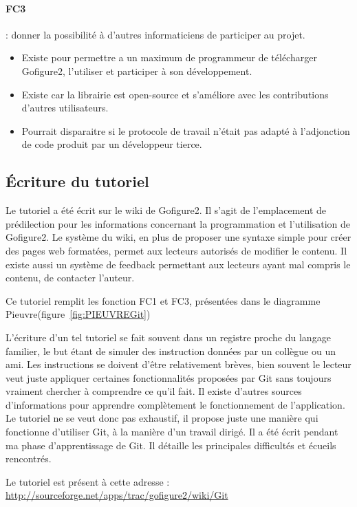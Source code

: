 \paragraph*{FC3} : donner la possibilité à d'autres informaticiens de participer au projet.
\begin{itemize}
  \item Existe pour permettre a un maximum de programmeur de télécharger Gofigure2, l'utiliser et participer à son développement.
  \item Existe car la librairie est open-source et s'améliore avec les contributions d'autres utilisateurs.
  \item Pourrait disparaitre si le protocole de travail n'était pas adapté à l'adjonction de code produit par un développeur tierce.
\end{itemize}


\subsection{Écriture du tutoriel}

Le tutoriel a été écrit sur le wiki de Gofigure2. Il s'agit de l'emplacement de prédilection pour les informations 
concernant la programmation et l'utilisation de Gofigure2. Le système du wiki, en plus de proposer une syntaxe simple 
pour créer des pages web formatées, permet aux lecteurs autorisés de modifier le contenu. 
Il existe aussi un système de feedback permettant aux lecteurs ayant mal compris le contenu, de contacter l'auteur.

Ce tutoriel remplit les fonction FC1 et FC3, présentées dans le diagramme Pieuvre(figure~\ref{fig:PIEUVREGit})

L'écriture d'un tel tutoriel se fait souvent dans un registre proche du langage familier,
le but étant de simuler des instruction données par un collègue ou un ami. 
Les instructions se doivent d'être relativement brèves, bien souvent le lecteur veut juste appliquer certaines fonctionnalités 
proposées par Git sans toujours vraiment chercher à comprendre ce qu'il fait. 
Il existe d'autres sources d'informations pour apprendre complètement le fonctionnement de l'application.
Le tutoriel ne se veut donc pas exhaustif, il propose juste une manière qui fonctionne d'utiliser Git,
à la manière d'un travail dirigé. Il a été écrit pendant ma phase d'apprentissage de Git. 
Il détaille les principales difficultés et écueils rencontrés. 

Le tutoriel est présent à cette adresse : \\
\url{http://sourceforge.net/apps/trac/gofigure2/wiki/Git}

